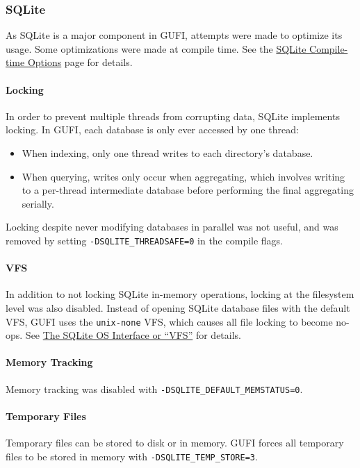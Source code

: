 \subsubsection{SQLite}
As SQLite is a major component in GUFI, attempts were made to optimize
its usage. Some optimizations were made at compile time. See the
\href{https://www.sqlite.org/compile.html}{SQLite Compile-time
  Options} page for details.

\paragraph{Locking}
In order to prevent multiple threads from corrupting data, SQLite
implements locking. In GUFI, each database is only ever accessed by
one thread:

\begin{itemize}
\item When indexing, only one thread writes to each directory's
  database.
\item When querying, writes only occur when aggregating, which
  involves writing to a per-thread intermediate database before
  performing the final aggregating serially.
\end{itemize}

Locking despite never modifying databases in parallel was not useful,
and was removed by setting \texttt{-DSQLITE\_THREADSAFE=0} in the
compile flags.

\paragraph{VFS}
In addition to not locking SQLite in-memory operations, locking at the
filesystem level was also disabled. Instead of opening SQLite database
files with the default VFS, GUFI uses the \texttt{unix-none} VFS,
which causes all file locking to become no-ops. See
\href{https://www.sqlite.org/vfs.html}{The SQLite OS Interface or
  ``VFS''} for details.

\paragraph{Memory Tracking}
Memory tracking was disabled with \texttt{-DSQLITE\_DEFAULT\_MEMSTATUS=0}.

\paragraph{Temporary Files}
Temporary files can be stored to disk or in memory. GUFI forces all
temporary files to be stored in memory with
\texttt{-DSQLITE\_TEMP\_STORE=3}.
